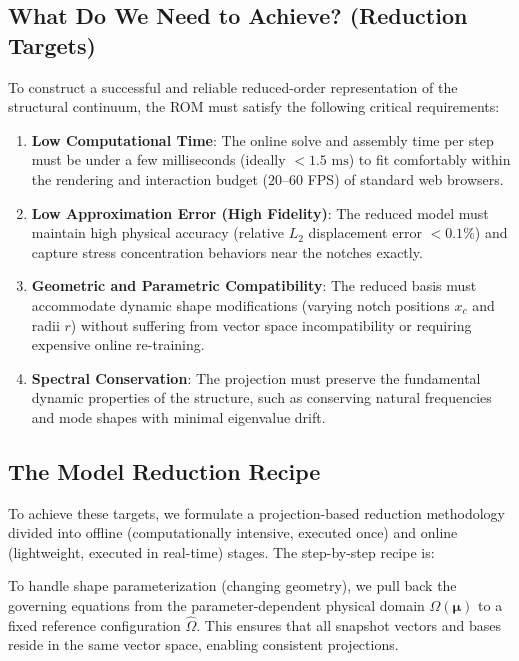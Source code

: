 \subsection{What Do We Need to Achieve? (Reduction Targets)}
To construct a successful and reliable reduced-order representation of the structural continuum, the ROM must satisfy the following critical requirements:
\begin{enumerate}
    \item \textbf{Low Computational Time}: The online solve and assembly time per step must be under a few milliseconds (ideally $<1.5\text{ ms}$) to fit comfortably within the rendering and interaction budget ($20$--$60$ FPS) of standard web browsers.
    \item \textbf{Low Approximation Error (High Fidelity)}: The reduced model must maintain high physical accuracy (relative $L_2$ displacement error $< 0.1\%$) and capture stress concentration behaviors near the notches exactly.
    \item \textbf{Geometric and Parametric Compatibility}: The reduced basis must accommodate dynamic shape modifications (varying notch positions $x_c$ and radii $r$) without suffering from vector space incompatibility or requiring expensive online re-training.
    \item \textbf{Spectral Conservation}: The projection must preserve the fundamental dynamic properties of the structure, such as conserving natural frequencies and mode shapes with minimal eigenvalue drift.
\end{enumerate}

\subsection{The Model Reduction Recipe}
To achieve these targets, we formulate a projection-based reduction methodology divided into offline (computationally intensive, executed once) and online (lightweight, executed in real-time) stages. The step-by-step recipe is:

\begin{tcolorbox}[colback=blue!5!white,colframe=blue!65!black,title={\textbf{Step 1: Pullback Mapping to a Static Reference Domain}}, fonttitle=\bfseries]
To handle shape parameterization (changing geometry), we pull back the governing equations from the parameter-dependent physical domain $\Omega(\boldsymbol{\mu})$ to a fixed reference configuration $\hat{\Omega}$. This ensures that all snapshot vectors and bases reside in the same vector space, enabling consistent projections.
\end{tcolorbox}

